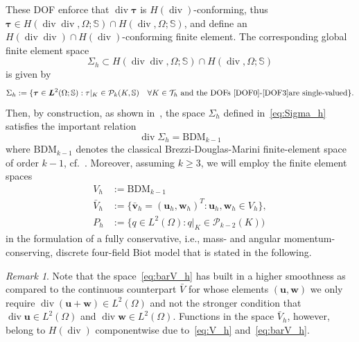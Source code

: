 \documentclass[11pt]{amsart}
\theoremstyle{remark}
\newtheorem{remark}{Remark}
\theoremstyle{definition}
\def\bu{{\boldsymbol u}}
\def\bv{{\boldsymbol v}}
\def\bw{{\boldsymbol w}}
\renewcommand{\div}{\operatorname{div}}
\renewcommand{\div}{\operatorname{div}}
\def\P{\mathcal P}
\def\bu{\boldsymbol u}
\def\bv{\boldsymbol v}
\def\bw{\boldsymbol w}
\begin{document}
These DOF enforce that $\operatorname{div} \boldsymbol{\tau}$ is $H(\operatorname{div})$-conforming, thus $\boldsymbol{\tau} \in H(\div \div,\Omega;\mathbb{S}) \cap H(\div,\Omega;\mathbb{S})$, and define an $H(\div \div) \cap H(\div)$-conforming finite element. The corresponding global finite element space
%
\begin{equation}\label{eq:conformity_Sigma_h}
\Sigma_h \subset H(\div \div, \Omega ; \mathbb{S}) \cap H(\div, \Omega ; \mathbb{S})
\end{equation}
%
is given by
%
{
\begin{equation}\label{eq:Sigma_h}
\Sigma_h :=\{\boldsymbol{\tau} \in \boldsymbol{L}^2(\Omega ; \mathbb{S}): \tau\vert_K \in \P_k(K, \mathbb{S}) \quad \forall K \in \mathcal{T}_h \mbox{ and the DOFs~\eqref{DOF0}-\eqref{DOF3}are single-valued} \} .
\end{equation}
}
Then, by construction, as shown in~\cite{ChenHuang2022}, the space $\Sigma_h$ defined in~\eqref{eq:Sigma_h} satisfies the important relation
%
\begin{equation}\label{eq:div_Sigma_h}
\div \Sigma_h = \text{BDM}_{k-1}
\end{equation}
%
where $\text{BDM}_{k-1}$ denotes the classical Brezzi-Douglas-Marini finite-element space of order $k-1$, cf.~\cite{Boffi2013mixed}.
%
Moreover, assuming $k \ge 3$, we will employ the finite element spaces
%
\begin{subequations}\label{eq:V_h_P_h}
\begin{align}
V_h & :=  \text{BDM}_{k-1} \label{eq:V_h} \\
\bar{V}_h & := \{ \bar{\bv}_h = (\bu_h,\bw_h)^T:  \bu_h , \bw_h \in V_h \}, \label{eq:barV_h} \\
P_h & := \{ q \in L^2(\Omega): q\vert_K \in \P_{k-2}(K)) \label{eq:P_h}
\end{align}
\end{subequations}
%
in the formulation of a fully conservative, i.e., mass- and angular momentum-conserving, discrete four-field Biot model that is stated in the following. 
%
\begin{remark}
Note that the space~\eqref{eq:barV_h} has built in a higher smoothness as compared to the continuous counterpart $\bar{V}$ for whose elements $(\bu,\bw)$ we only require $\div (\bu + \bw) \in  L^2(\Omega)$ and not the stronger condition that $\div \bu \in  L^2(\Omega)$ and $\div \bw \in  L^2(\Omega)$.  Functions in the space $\bar{V}_h$,
however, belong to $H(\div)$ componentwise due to~\eqref{eq:V_h} and~\eqref{eq:barV_h}.
\end{remark}
\end{document}
